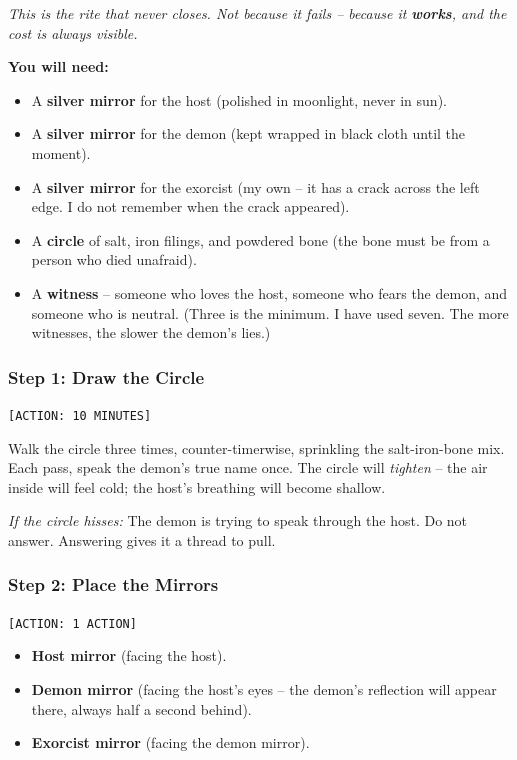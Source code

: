 \emph{This is the rite that never closes. Not because it fails -- because it \textbf{works}, and the cost is always visible.}

\textbf{You will need:}
\begin{itemize}
  \item A \textbf{silver mirror} for the host (polished in moonlight, never in sun).
  \item A \textbf{silver mirror} for the demon (kept wrapped in black cloth until the moment).
  \item A \textbf{silver mirror} for the exorcist (my own -- it has a crack across the left edge. I do not remember when the crack appeared).
  \item A \textbf{circle} of salt, iron filings, and powdered bone (the bone must be from a person who died unafraid).
  \item A \textbf{witness} -- someone who loves the host, someone who fears the demon, and someone who is neutral. (Three is the minimum. I have used seven. The more witnesses, the slower the demon's lies.)
\end{itemize}

\subsubsection{Step 1: Draw the Circle} \hfill \texttt{[ACTION: 10 MINUTES]}

Walk the circle three times, counter-timerwise, sprinkling the salt-iron-bone mix. Each pass, speak the demon's true name once. The circle will \emph{tighten} -- the air inside will feel cold; the host's breathing will become shallow.  

\emph{If the circle hisses:} The demon is trying to speak through the host. Do not answer. Answering gives it a thread to pull.

\subsubsection{Step 2: Place the Mirrors} \hfill \texttt{[ACTION: 1 ACTION]}

\begin{itemize}
  \item \textbf{Host mirror} (facing the host).
  \item \textbf{Demon mirror} (facing the host's eyes -- the demon's reflection will appear there, always half a second behind).
  \item \textbf{Exorcist mirror} (facing the demon mirror).
\end{itemize}

